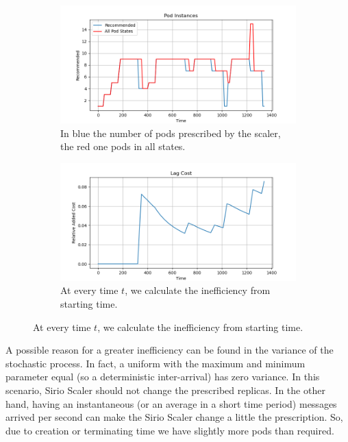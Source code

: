 \begin{figure}
    \centering
    \begin{subfigure}{0.85\textwidth}
        \centering
        \includegraphics[width=\textwidth]{images/sliding_window/constant/pods.png}
        \caption{In blue the number of pods prescribed by the scaler, the red one pods in all states.}
        \label{fig:exponential_fast_pods}
    \end{subfigure}
    \begin{subfigure}{0.85\textwidth}
        \includegraphics[width=\linewidth]{images/sliding_window/constant/lag_cost_cumulative.png}
        \caption{At every time $t$, we calculate the inefficiency from starting time.}
        \label{fig:exponential_fast_inefficiency}
    \end{subfigure}
\end{figure}

A possible reason for a greater inefficiency can be found in the variance of the stochastic process. In fact, a uniform with the maximum and minimum parameter equal (so a deterministic inter-arrival) has zero variance. In this scenario, Sirio Scaler should not change the prescribed replicas. In the other hand, having an instantaneous (or an average in a short time period) messages arrived per second can make the Sirio Scaler change a little the prescription. So, due to creation or terminating time we have slightly more pods than required.
